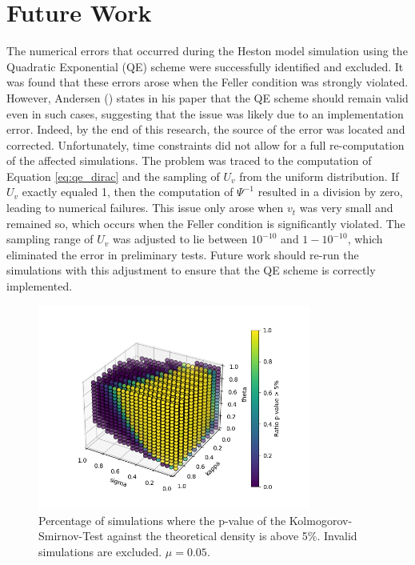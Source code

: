 \section{Future Work}

The numerical errors that occurred during the Heston model simulation using the Quadratic Exponential (QE) scheme were successfully identified and excluded. It was found that these errors arose when the Feller condition was strongly violated. However, Andersen (\citeyear{andersenEfficientSimulationHeston2007}) states in his paper that the QE scheme should remain valid even in such cases, suggesting that the issue was likely due to an implementation error. Indeed, by the end of this research, the source of the error was located and corrected. Unfortunately, time constraints did not allow for a full re-computation of the affected simulations. The problem was traced to the computation of Equation \eqref{eq:qe_dirac} and the sampling of $U_v$ from the uniform distribution. If $U_v$ exactly equaled 1, then the computation of $\Psi^{-1}$ resulted in a division by zero, leading to numerical failures. This issue only arose when $v_t$ was very small and remained so, which occurs when the Feller condition is significantly violated. The sampling range of $U_v$ was adjusted to lie between $10^{-10}$ and $1-10^{-10}$, which eliminated the error in preliminary tests. Future work should re-run the simulations with this adjustment to ensure that the QE scheme is correctly implemented.

\begin{figure}
    \centering
    \includegraphics[width=0.8\textwidth]{img/GC_cum_KS_3d_p_value_sigma_kappa_theta.png}
    \caption{Percentage of simulations where the p-value of the Kolmogorov-Smirnov-Test against the theoretical density is above 5\%. Invalid simulations are excluded. $\mu=0.05$.}
    \label{fig:GC_cum_KS_3d_p_value_sigma_kappa_theta_mu005}
\end{figure}

